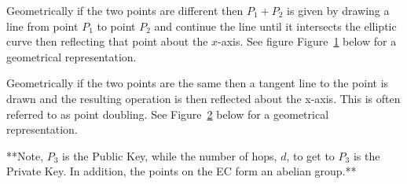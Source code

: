 Geometrically if the two points are different then $P_1 + P_2$ is given by drawing a line from point $P_1$ to point $P_2$ and continue the line until it intersects the elliptic curve then reflecting that point about the $x$-axis.  See figure Figure~\ref{fig:DH:DHKE_6} below for a geometrical representation.
\begin{figure}[H]
	  \caption{\label{fig:DH:DHKE_6} }
\end{figure}
Geometrically if the two points are the same then a tangent line to the point is drawn and the resulting operation is then reflected about the x-axis.  This is often referred to as point doubling. See Figure~\ref{fig:DH:DHKE_7} below for a geometrical representation.
\begin{figure}[H]
	  \caption{\label{fig:DH:DHKE_7} }
\end{figure}
**Note, $P_3$ is the Public Key, while the number of hops, $d$, to get to $P_3$ is the Private Key.  In addition, the points on the EC form an abelian group.**

